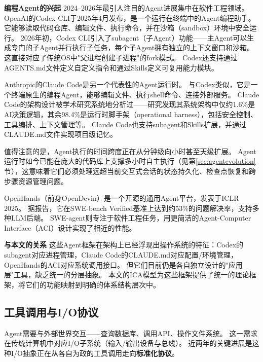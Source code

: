 \textbf{编程Agent的兴起}
2024--2026年最引人注目的Agent进展集中在软件工程领域。
OpenAI的Codex CLI\cite{openai_codex_overview_2026}于2025年4月发布，是一个运行在终端中的Agent编程助手。
它能够读取代码仓库、编辑文件、执行命令，并在沙箱（sandbox）环境中安全运行\cite{openai_codex_sandbox_2026}。
2026年初，Codex CLI引入了subagent（子Agent）功能——主Agent可以生成专门的子Agent并行执行子任务，每个子Agent拥有独立的上下文窗口和沙箱。
这直接对应了传统OS中"父进程创建子进程"的fork模式。
Codex还支持通过AGENTS.md文件定义自定义指令\cite{openai_codex_agents_md_2026}和通过Skills定义可复用能力模块\cite{openai_codex_skills_2026}。

Anthropic的Claude Code\cite{anthropic_claudecode_overview_2026}是另一个代表性的Agent运行时。
与Codex类似，它是一个终端原生的编程Agent，能够编辑文件、执行shell命令、连接外部服务。
Claude Code的架构设计被学术研究系统地分析过\cite{dive_claudecode_2026}——研究发现其系统架构中仅约1.6\%是AI决策逻辑，其余98.4\%是运行时脚手架（operational harness），包括安全控制、工具编排、上下文管理等。
Claude Code也支持subagent\cite{anthropic_claudecode_subagents_2026}和Skills\cite{anthropic_claudecode_skills_2026}扩展，并通过CLAUDE.md文件实现项目级记忆\cite{anthropic_claudecode_memory_2026}。

值得注意的是，Agent执行的时间跨度正在从分钟级向小时甚至天级扩展。
Agent运行时如今已能在庞大的代码库上支撑多小时自主执行\cite{anthropic2026agenticreport}（见第\ref{sec:agentevolution}节），这意味着它们必须处理远超当前交互式会话的状态持久化、检查点恢复和跨步骤资源管理问题。

OpenHands\cite{openhands_paper_2025}（前身OpenDevin）是一个开源的通用Agent平台，发表于ICLR 2025。
据报告，它在SWE-bench Verified基准上达到约53\%的问题解决率\cite{openhands_paper_2025,swebench2023}，支持多种LLM后端。
SWE-agent\cite{sweagent2024}则专注于软件工程任务，用更简洁的Agent-Computer Interface（ACI）设计实现了相近的性能。

\textbf{与本文的关系}
这些Agent框架在架构上已经浮现出操作系统的特征：Codex的subagent对应进程管理，Claude Code的CLAUDE.md对应配置/环境管理，OpenHands的ACI对应系统调用接口。
但它们目前仍是各自独立设计的"应用层"工具，缺乏统一的分层抽象。
本文的ICA模型为这些框架提供了统一的理论框架，将它们的功能映射到明确的体系结构层次中。

\subsection{工具调用与I/O协议}
\label{sec:related-io}

Agent需要与外部世界交互——查询数据库、调用API、操作文件系统。
这一需求在传统计算机中对应I/O子系统（输入/输出设备与总线）。
近两年的关键进展是这种I/O抽象正在从各自为政的工具调用走向\textbf{标准化协议}。

